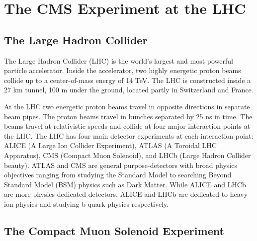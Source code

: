 \chapter{The CMS Experiment at the LHC}
\label{chapter:three}
\section{The Large Hadron Collider}

The Large Hadron Collider (LHC) is the world’s largest and most powerful particle accelerator. Inside the accelerator, two highly energetic proton beams collide up to a center-of-mass energy of 14 TeV. The LHC is constructed inside a 27 km tunnel, 100 m under the ground, located partly in Switzerland and France.

At the LHC two energetic proton beams travel in opposite directions in separate beam pipes. The proton beams travel in bunches separated by 25 ns in time. The beams travel at relativistic speeds and collide at four major interaction points at the LHC. The LHC has four main detector experiments at each interaction point: ALICE (A Large Ion Collider Experiment), ATLAS (A Toroidal LHC Apparatus), CMS (Compact Muon Solenoid), and LHCb (Large Hadron Collider beauty). ATLAS and CMS are general purpose-detectors with broad physics objectives ranging from studying the Standard Model to searching Beyond Standard Model (BSM) physics such as Dark Matter. While ALICE and LHCb are more physics dedicated detectors, ALICE and LHCb are dedicated to heavy-ion physics and studying b-quark physics respectively.






\section{The Compact Muon Solenoid Experiment}
